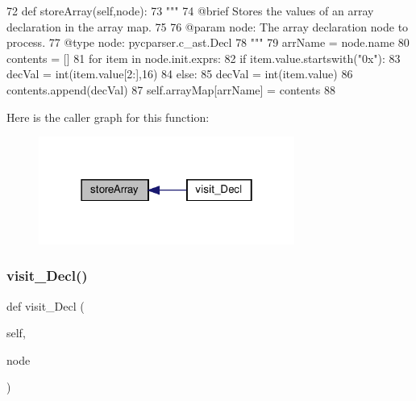 \begin{DoxyCode}
72     \textcolor{keyword}{def }storeArray(self,node):
73         \textcolor{stringliteral}{"""
}
74 \textcolor{stringliteral}{        @brief Stores the values of an array declaration in the array map.
}
75 \textcolor{stringliteral}{
}
76 \textcolor{stringliteral}{        @param node: The array declaration node to process.
}
77 \textcolor{stringliteral}{        @type node: pycparser.c\_ast.Decl
}
78 \textcolor{stringliteral}{        """}
79         arrName = node.name
80         contents = []
81         \textcolor{keywordflow}{for} item \textcolor{keywordflow}{in} node.init.exprs:
82             \textcolor{keywordflow}{if} item.value.startswith(\textcolor{stringliteral}{"0x"}):
83                 decVal = int(item.value[2:],16)
84             \textcolor{keywordflow}{else}:
85                 decVal = int(item.value)
86             contents.append(decVal)
87         self.arrayMap[arrName] = contents
88 
\end{DoxyCode}
Here is the caller graph for this function\+:\nopagebreak
\begin{figure}[H]
\begin{center}
\leavevmode
\includegraphics[width=238pt]{classVisitors_1_1DeclVisitor_a9e0516fab7677e7c20e7761b239d5a88_icgraph}
\end{center}
\end{figure}
\mbox{\label{classVisitors_1_1DeclVisitor_a6568bead87923bbcaa593e5f226920f0}} 
\subsubsection{\texorpdfstring{visit\+\_\+\+Decl()}{visit\_Decl()}}
{\footnotesize\ttfamily def visit\+\_\+\+Decl (\begin{DoxyParamCaption}\item[{}]{self,  }\item[{}]{node }\end{DoxyParamCaption})}

